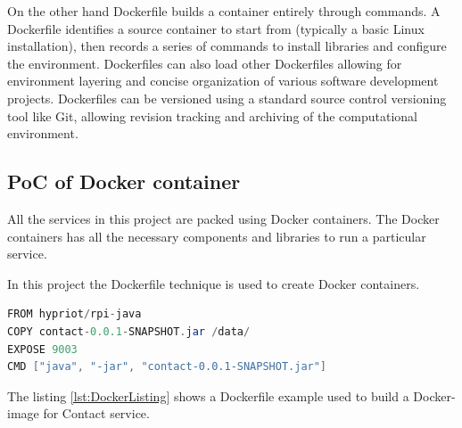 On the other hand Dockerfile builds a container entirely through commands. A Dockerfile identifies a source container to start from (typically a basic Linux installation), then records a series of commands to install libraries and configure the environment. Dockerfiles can also load other Dockerfiles allowing for environment layering and concise organization of various software development projects. Dockerfiles can be versioned using a standard source control versioning tool like Git, allowing revision tracking and archiving of the computational environment.\cite{chamberlain2014using}\\ 

\subsection{PoC of Docker container}
All the services in this project are packed using Docker containers. The Docker containers has all the necessary components and libraries to run a particular service. 

In this project the Dockerfile technique is used to create Docker containers. 

\newpage
\begin{lstlisting}[frame=single,caption={Dockerfile with command to be carried out},label={{lst:DockerListing}},language=Java]
FROM hypriot/rpi-java
COPY contact-0.0.1-SNAPSHOT.jar /data/
EXPOSE 9003
CMD ["java", "-jar", "contact-0.0.1-SNAPSHOT.jar"]
\end{lstlisting}

The listing \ref{lst:DockerListing} shows a Dockerfile example used to build a Docker-image for Contact service. %

%
%
%
%
%  
%

